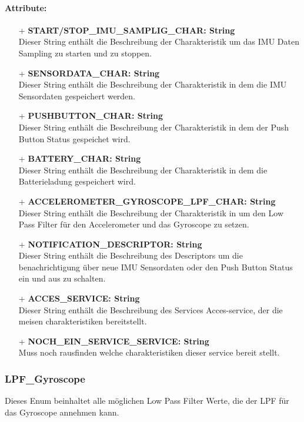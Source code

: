 \documentclass[a4paper,12pt]{article}
\begin{document}
\paragraph{Attribute:}
\begin{itemize}
	\item[+] \textbf{START/STOP\_IMU\_SAMPLIG\_CHAR: String}\\Dieser String enthält die Beschreibung der Charakteristik um das IMU Daten Sampling zu starten und zu stoppen.
	\item[+] \textbf{SENSORDATA\_CHAR: String}\\Dieser String enthält die Beschreibung der Charakteristik in dem die IMU Sensordaten gespeichert werden.
	\item[+] \textbf{PUSHBUTTON\_CHAR: String}\\Dieser String enthält die Beschreibung der Charakteristik in dem der Push Button Status gespeichet wird.
	\item[+] \textbf{BATTERY\_CHAR: String}\\Dieser String enthält die Beschreibung der Charakteristik in dem die Batterieladung gespeichert wird.
	\item[+] \textbf{ACCELEROMETER\_GYROSCOPE\_LPF\_CHAR: String}\\Dieser String enthält die Beschreibung der Charakteristik in um den Low Pass Filter für den Accelerometer und das Gyroscope zu setzen.
	\item[+] \textbf{NOTIFICATION\_DESCRIPTOR: String}\\Dieser String enthält die Beschreibung des Descriptors um die benachrichtigung über neue IMU Sensordaten oder den Push Button Status ein und aus zu schalten.
\item[+] \textbf{ACCES\_SERVICE: String}\\Dieser String enthält die Beschreibung des Services Acces-service, der die meisen charakteristiken bereitstellt.
\item[+] \textbf{NOCH\_EIN\_SERVICE\_SERVICE: String}\\Muss noch rausfinden welche charakteristiken dieser service bereit stellt.
\end{itemize}


\subsubsection{LPF\_Gyroscope}
Dieses Enum beinhaltet alle möglichen Low Pass Filter Werte, die der LPF für das Gyroscope annehmen kann.
\end{document}
